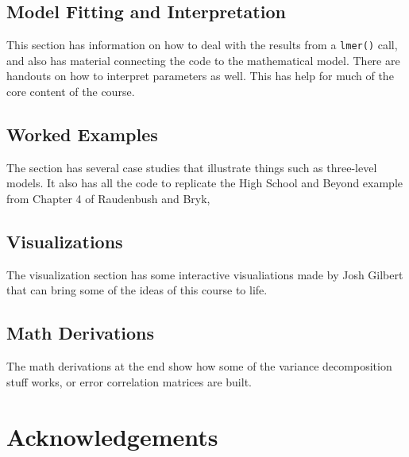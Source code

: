 \documentclass[
  letterpaper,
  DIV=11,
  numbers=noendperiod]{scrreprt}
\begin{document}
\hypertarget{model-fitting-and-interpretation}{%
\subsection*{Model Fitting and
Interpretation}\label{model-fitting-and-interpretation}}

This section has information on how to deal with the results from a
\texttt{lmer()} call, and also has material connecting the code to the
mathematical model. There are handouts on how to interpret parameters as
well. This has help for much of the core content of the course.

\hypertarget{worked-examples}{%
\subsection*{Worked Examples}\label{worked-examples}}

The section has several case studies that illustrate things such as
three-level models. It also has all the code to replicate the High
School and Beyond example from Chapter 4 of Raudenbush and Bryk,

\hypertarget{visualizations}{%
\subsection*{Visualizations}\label{visualizations}}

The visualization section has some interactive visualiations made by
Josh Gilbert that can bring some of the ideas of this course to life.

\hypertarget{math-derivations}{%
\subsection*{Math Derivations}\label{math-derivations}}

The math derivations at the end show how some of the variance
decomposition stuff works, or error correlation matrices are built.

\hypertarget{acknowledgements}{%
\section*{Acknowledgements}\label{acknowledgements}}
\end{document}
